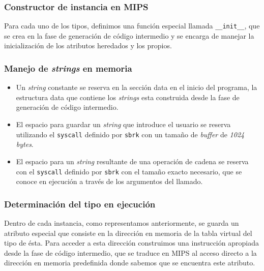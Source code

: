 \documentclass[a4paper,10pt,twocolumn]{article}
\begin{document}
\subsubsection{Constructor de instancia en MIPS}

Para cada uno de los tipos, definimos una función especial llamada \lstinline|__init__|, que se crea en la fase de generación de código intermedio y se encarga de manejar la inicialización de los atributos heredados y los propios. 

\subsubsection{Manejo de \textit{strings} en memoria}

\begin{itemize}
	\item Un \textit{string} constante se reserva en la sección data en el inicio del programa, la estructura data que contiene los \textit{strings} esta construida desde la fase de generación de código intermedio.
	\item El espacio para guardar un \textit{string} que introduce el usuario se reserva utilizando el \lstinline|syscall| definido por \lstinline|sbrk| con un tamaño de \textit{buffer} de \textit{1024 bytes}. 
	\item El espacio para un \textit{string} resultante de una operación de cadena se reserva con el \lstinline|syscall| definido por \lstinline|sbrk| con el tamaño exacto necesario, que se conoce en ejecución a través de los argumentos del llamado.  
\end{itemize}

\subsubsection{Determinación del tipo en ejecución}

Dentro de cada instancia, como representamos anteriormente, se guarda un atributo especial que consiste en la dirección en memoria de la tabla virtual del tipo de ésta. Para acceder a esta dirección construimos una instrucción apropiada desde la fase de código intermedio, que se traduce en MIPS al acceso directo a la dirección en memoria predefinida donde sabemos que se encuentra este atributo. 


\label{end}
\end{document}
